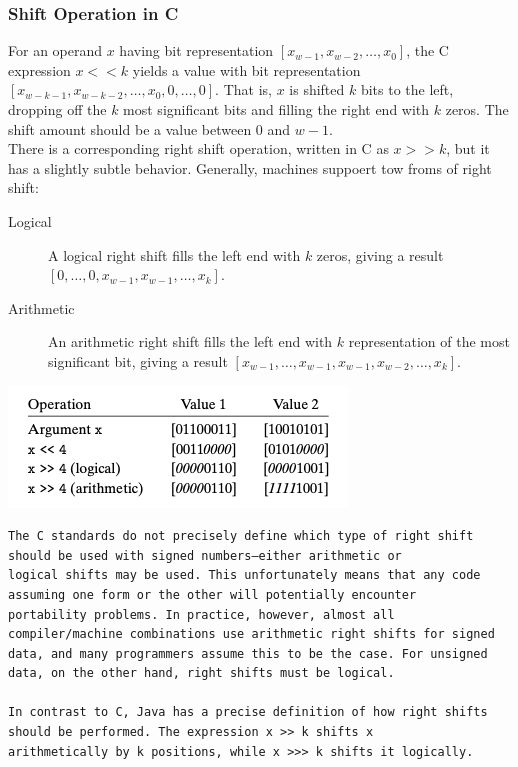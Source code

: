 \documentclass[11pt]{article}
\begin{document}
\subsubsection{Shift Operation in C}
\label{sec:org8a76de1}
For an operand \(x\) having bit representation \([x_{w-1}, x_{w-2},\dots,x_0]\), the C expression \(x << k\) yields a value with bit representation \([x_{w-k-1},x_{w-k-2},\dots,x_0,0,\dots,0]\). That is, \(x\) is shifted \(k\) bits to the left, dropping off the \(k\) most significant bits and filling the right end with \(k\) zeros. The shift amount should be a value between 0 and \(w-1\).\\

There is a corresponding right shift operation, written in C as \(x >> k\), but it has a slightly subtle behavior. Generally, machines suppoert tow froms of right shift:\\
\begin{description}
\item[{Logical}] A logical right shift fills the left end with \(k\) zeros, giving a result \([0,\dots,0,x_{w-1},x_{w-1},\dots,x_k]\).\\
\item[{Arithmetic}] An arithmetic right shift fills the left end with \(k\) representation of the most significant bit, giving a result \([x_{w-1},\dots,x_{w-1},x_{w-1},x_{w-2},\dots,x_k]\).\\
\end{description}

\begin{center}
\includegraphics[width=.9\linewidth]{pics/shift-operations.png}
\end{center}


\begin{verbatim}
The C standards do not precisely define which type of right shift should be used with signed numbers—either arithmetic or
logical shifts may be used. This unfortunately means that any code assuming one form or the other will potentially encounter
portability problems. In practice, however, almost all compiler/machine combinations use arithmetic right shifts for signed
data, and many programmers assume this to be the case. For unsigned data, on the other hand, right shifts must be logical.

In contrast to C, Java has a precise definition of how right shifts should be performed. The expression x >> k shifts x
arithmetically by k positions, while x >>> k shifts it logically.

\end{verbatim}
\end{document}
